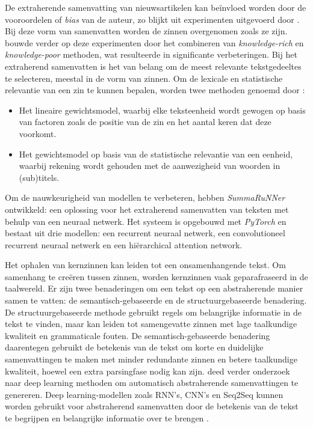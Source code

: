 \medspace

De extraherende samenvatting van nieuwsartikelen kan beïnvloed worden door de vooroordelen of \textit{bias} van de auteur, zo blijkt uit experimenten uitgevoerd door \textcite{McKeown1999}. Bij deze vorm van samenvatten worden de zinnen overgenomen zoals ze zijn. \textcite{Hahn2000} bouwde verder op deze experimenten door het combineren van \textit{knowledge-rich} en \textit{knowledge-poor} methoden, wat resulteerde in significante verbeteringen. Bij het extraherend samenvatten is het van belang om de meest relevante tekstgedeeltes te selecteren, meestal in de vorm van zinnen. Om de lexicale en statistische relevantie van een zin te kunnen bepalen, worden twee methoden genoemd door \textcite{Hahn2000}:

\begin{itemize}
	\item Het lineaire gewichtsmodel, waarbij elke teksteenheid wordt gewogen op basis van factoren zoals de positie van de zin en het aantal keren dat deze voorkomt.
	\item Het gewichtsmodel op basis van de statistische relevantie van een eenheid, waarbij rekening wordt gehouden met de aanwezigheid van woorden in (sub)titels.
\end{itemize}

\medspace

Om de nauwkeurigheid van modellen te verbeteren, hebben \textcite{Nallapati2017} \textit{SummaRuNNer} ontwikkeld: een oplossing voor het extraherend samenvatten van teksten met behulp van een neuraal netwerk. Het systeem is opgebouwd met \textit{PyTorch} en bestaat uit drie modellen: een recurrent neuraal netwerk, een convolutioneel recurrent neuraal netwerk en een hiërarchical attention network.

\medspace

Het ophalen van kernzinnen kan leiden tot een onsamenhangende tekst. Om samenhang te creëren tussen zinnen, worden kernzinnen vaak geparafraseerd in de taalwereld. Er zijn twee benaderingen om een tekst op een abstraherende manier samen te vatten: de semantisch-gebaseerde en de structuurgebaseerde benadering. De structuurgebaseerde methode gebruikt regels om belangrijke informatie in de tekst te vinden, maar kan leiden tot samengevatte zinnen met lage taalkundige kwaliteit en grammaticale fouten. De semantisch-gebaseerde benadering daarentegen gebruikt de betekenis van de tekst om korte en duidelijke samenvattingen te maken met minder redundante zinnen en betere taalkundige kwaliteit, hoewel een extra parsingfase nodig kan zijn. \textcite{Cao2022} deed verder onderzoek naar deep learning methoden om automatisch abstraherende samenvattingen te genereren. Deep learning-modellen zoals RNN's, CNN's en Seq2Seq kunnen worden gebruikt voor abstraherend samenvatten door de betekenis van de tekst te begrijpen en belangrijke informatie over te brengen \autocite{Suleiman2020}.

